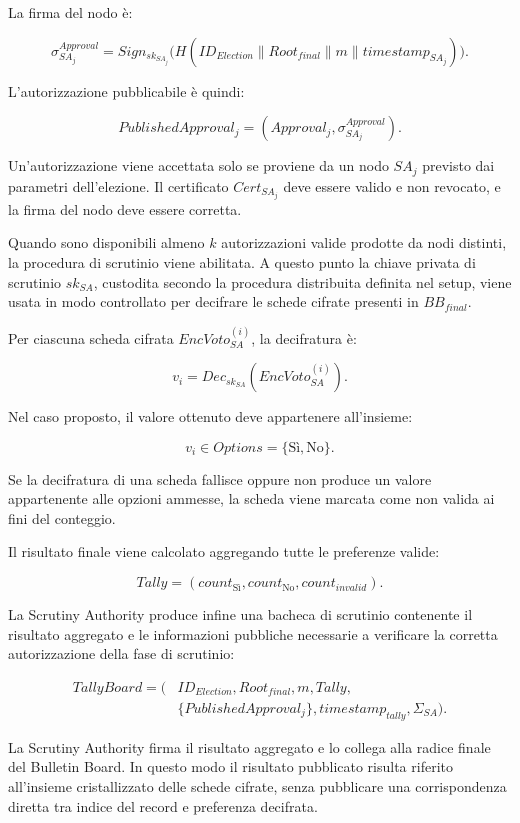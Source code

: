 \documentclass[a4paper,12pt]{article}
\begin{document}
La firma del nodo \`e:

\[
	\sigma_{SA_j}^{Approval} =
	Sign_{sk_{SA_j}}
	\big(
	H(ID_{Election} \parallel Root_{final} \parallel m \parallel timestamp_{SA_j})
	\big).
\]

L'autorizzazione pubblicabile \`e quindi:

\[
	PublishedApproval_j =
	(Approval_j, \sigma_{SA_j}^{Approval}).
\]

Un'autorizzazione viene accettata solo se proviene da un nodo \(SA_j\) previsto dai parametri dell'elezione. Il certificato \(Cert_{SA_j}\) deve essere valido e non revocato, e la firma del nodo deve essere corretta.

Quando sono disponibili almeno \(k\) autorizzazioni valide prodotte da nodi distinti, la procedura di scrutinio viene abilitata.
A questo punto la chiave privata di scrutinio \(sk_{SA}\), custodita secondo la procedura distribuita definita nel setup, viene usata in modo controllato per decifrare le schede cifrate presenti in \(BB_{final}\).

Per ciascuna scheda cifrata \(EncVoto_{SA}^{(i)}\), la decifratura \`e:

\[
	v_i =
	Dec_{sk_{SA}}(EncVoto_{SA}^{(i)}).
\]

Nel caso proposto, il valore ottenuto deve appartenere all'insieme:

\[
	v_i \in Options = \{\text{S\`i}, \text{No}\}.
\]

Se la decifratura di una scheda fallisce oppure non produce un valore appartenente alle opzioni ammesse, la scheda viene marcata come non valida ai fini del conteggio.

Il risultato finale viene calcolato aggregando tutte le preferenze valide:

\[
	Tally =
	(count_{\text{S\`i}}, count_{\text{No}}, count_{invalid}).
\]


La Scrutiny Authority produce infine una bacheca di scrutinio contenente il risultato aggregato e le informazioni pubbliche necessarie a verificare la corretta autorizzazione della fase di scrutinio:

\[
\begin{aligned}
	TallyBoard = (&ID_{Election}, Root_{final}, m, Tally,\\
	&\{PublishedApproval_j\}, timestamp_{tally}, \Sigma_{SA}).
\end{aligned}
\]

La Scrutiny Authority firma il risultato aggregato e lo collega alla radice finale del Bulletin Board.
In questo modo il risultato pubblicato risulta riferito all'insieme cristallizzato delle schede cifrate, senza pubblicare una corrispondenza diretta tra indice del record e preferenza decifrata.
\end{document}
